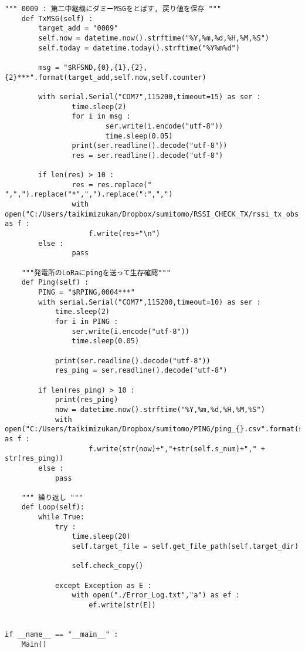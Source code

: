 \begin{lstlisting}[label=loras,caption=LoRa\_obs\_transmit.py]
        """ 0009 : 第二中継機にダミーMSGをとばす, 戻り値を保存 """
    def TxMSG(self) :
        target_add = "0009"
        self.now = datetime.now().strftime("%Y,%m,%d,%H,%M,%S")
        self.today = datetime.today().strftime("%Y%m%d")
        
        msg = "$RFSND,{0},{1},{2},{2}***".format(target_add,self.now,self.counter)

        with serial.Serial("COM7",115200,timeout=15) as ser :
                time.sleep(2)
                for i in msg :
                        ser.write(i.encode("utf-8"))
                        time.sleep(0.05)
                print(ser.readline().decode("utf-8"))
                res = ser.readline().decode("utf-8")

        if len(res) > 10 :
                res = res.replace(" ",",").replace("*",",").replace(":",",")
                with open("C:/Users/taikimizukan/Dropbox/sumitomo/RSSI_CHECK_TX/rssi_tx_obs_{}.csv".format(str(self.today)),"a") as f :
                    f.write(res+"\n")                  
        else :
                pass

    """発電所のLoRaにpingを送って生存確認"""
    def Ping(self) :
        PING = "$RPING,0004***"
        with serial.Serial("COM7",115200,timeout=10) as ser :
            time.sleep(2)
            for i in PING :
                ser.write(i.encode("utf-8"))
                time.sleep(0.05)

            print(ser.readline().decode("utf-8"))
            res_ping = ser.readline().decode("utf-8")
                
        if len(res_ping) > 10 :
            print(res_ping)
            now = datetime.now().strftime("%Y,%m,%d,%H,%M,%S")
            with open("C:/Users/taikimizukan/Dropbox/sumitomo/PING/ping_{}.csv".format(str(self.today)),"a") as f :
                    f.write(str(now)+","+str(self.s_num)+"," + str(res_ping))
        else :
            pass

    """ 繰り返し """
    def Loop(self):  
        while True:
            try :
                time.sleep(20)
                self.target_file = self.get_file_path(self.target_dir)

                self.check_copy()
            
            except Exception as E :
                with open("./Error_Log.txt","a") as ef :
                    ef.write(str(E))


if __name__ == "__main__" :
    Main()
\end{lstlisting}
